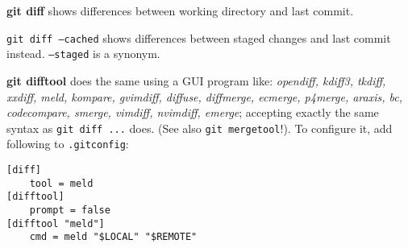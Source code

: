 %

\textbf{git diff} shows differences between working directory and last commit.

\texttt{git diff --cached} shows differences between staged changes and last commit instead.
\texttt{--staged} is a synonym.

\textbf{git difftool} does the same using a GUI program like: \emph{opendiff, kdiff3, tkdiff, xxdiff, meld, kompare, gvimdiff, diffuse, diffmerge, ecmerge, p4merge, araxis, bc, codecompare, smerge, vimdiff, nvimdiff, emerge};
accepting exactly the same syntax as \texttt{git diff ...} does.
(See also \texttt{git mergetool}!).
To configure it, add following to \texttt{.gitconfig}:
\begin{verbatim}
[diff]
    tool = meld
[difftool]
    prompt = false
[difftool "meld"]
    cmd = meld "$LOCAL" "$REMOTE"
\end{verbatim}

%